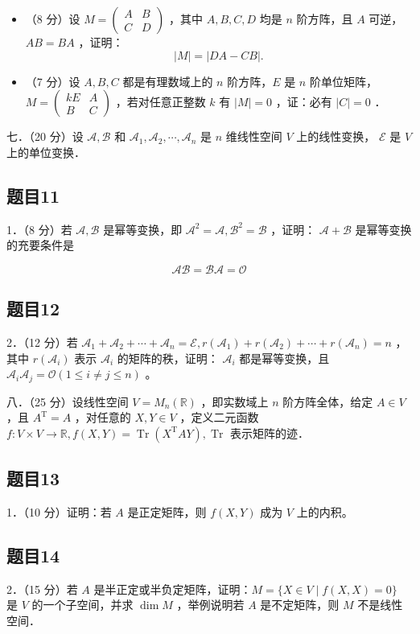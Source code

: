 \documentclass{article}
\begin{document}
\begin{itemize}

  \item[1．] （8 分）设 \(M=\left(\begin{array}{ll}A & B \\ C & D\end{array}\right)\) ，其中 \(A, B, C, D\) 均是 \(n\) 阶方阵，且 \(A\) 可逆，\(A B=B A\) ，证明：
\[
|M|=|D A-C B| .
\]

  \item[2．] （7 分）设 \(A, B, C\) 都是有理数域上的 \(n\) 阶方阵，\(E\) 是 \(n\) 阶单位矩阵，\(M=\left(\begin{array}{cc}k E & A \\ B & C\end{array}\right)\) ，若对任意正整数 \(k\) 有 \(|M|=0\) ，证：必有 \(|C|=0\) ．
\end{itemize}

七．（20 分）设 \(\mathcal{A}, \mathcal{B}\) 和 \(\mathcal{A}_{1}, \mathcal{A}_{2}, \cdots, \mathcal{A}_{n}\) 是 \(n\) 维线性空间 \(V\) 上的线性变换， \(\mathcal{E}\) 是 \(V\) 上的单位变换．\\

\subsection{题目11}
1．（8 分）若 \(\mathcal{A}, \mathcal{B}\) 是幂等变换，即 \(\mathcal{A}^{2}=\mathcal{A}, \mathcal{B}^{2}=\mathcal{B}\) ，证明： \(\mathcal{A}+\mathcal{B}\) 是幂等变换的充要条件是

\[
\mathcal{A}\mathcal{B}=\mathcal{B}\mathcal{A}=\mathcal{O}
\]

\subsection{题目12}
2．（12 分）若 \(\mathcal{A}_{1}+\mathcal{A}_{2}+\cdots+\mathcal{A}_{n}=\mathcal{E}, r\left(\mathcal{A}_{1}\right)+r\left(\mathcal{A}_{2}\right)+\cdots+r\left(\mathcal{A}_{n}\right)=n\) ，其中 \(r\left(\mathcal{A}_{i}\right)\) 表示 \(\mathcal{A}_{i}\) 的矩阵的秩，证明： \(\mathcal{A}_{i}\) 都是幂等变换，且 \(\mathcal{A}_{i} \mathcal{A}_{j}=\mathcal{O}(1 \leq i \neq j \leq n)\) 。

八．（25 分）设线性空间 \(V=M_{n}(\mathbb{R})\) ，即实数域上 \(n\) 阶方阵全体，给定 \(A \in V\) ，且 \(A^{\mathrm{T}}=A\) ，对任意的 \(X, Y \in V\) ，定义二元函数 \(f: V \times V \rightarrow \mathbb{R}, f(X, Y)=\operatorname{Tr}\left(X^{\mathrm{T}} A Y\right), \operatorname{Tr}\) 表示矩阵的迹．\\

\subsection{题目13}
1．（10 分）证明：若 \(A\) 是正定矩阵，则 \(f(X, Y)\) 成为 \(V\) 上的内积。\\

\subsection{题目14}
2．（15 分）若 \(A\) 是半正定或半负定矩阵，证明：\(M=\{X \in V \mid f(X, X)=0\}\) 是 \(V\) 的一个子空间，并求 \(\operatorname{dim} M\) ，举例说明若 \(A\) 是不定矩阵，则 \(M\) 不是线性空间．
\end{document}
